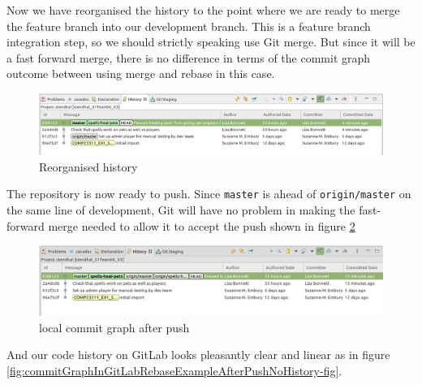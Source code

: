 \documentclass[
]{book}
\begin{document}
Now we have reorganised the history to the point where we are ready to merge the feature branch into our development branch. This is a feature branch integration step, so we should strictly speaking use Git merge. But since it will be a fast forward merge, there is no difference in terms of the commit graph outcome between using merge and rebase in this case.

\begin{figure}

{\centering \includegraphics[width=1\linewidth]{images/localCommitGraphRebaseExampleCompleteNoHistory} 

}

\caption{Reorganised history}\label{fig:localCommitGraphRebaseExampleCompleteNoHistory-fig}
\end{figure}

The repository is now ready to push. Since \texttt{master} is ahead of \texttt{origin/master} on the same line of development, Git will have no problem in making the fast-forward merge needed to allow it to accept the push shown in figure \ref{fig:localCommitGraphRebaseExampleAfterPushNoHistory-fig}

\begin{figure}

{\centering \includegraphics[width=1\linewidth]{images/localCommitGraphRebaseExampleAfterPushNoHistory} 

}

\caption{local commit graph after push}\label{fig:localCommitGraphRebaseExampleAfterPushNoHistory-fig}
\end{figure}

And our code history on GitLab looks pleasantly clear and linear as in figure \ref{fig:commitGraphInGitLabRebaseExampleAfterPushNoHistory-fig}.
\end{document}
